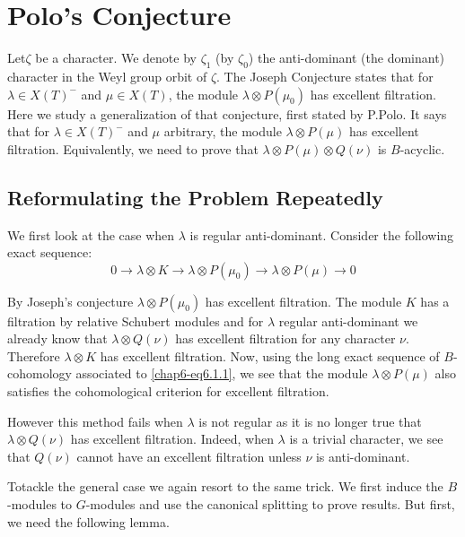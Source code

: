 \chapter{Polo's Conjecture}\label{chap6}

Let\pageoriginale $\zeta$\label{page56} be a character. We denote by $\zeta_{1}$ (by
$\zeta_{0}$) the anti-dominant (the dominant) character in the Weyl
group orbit of $\zeta$. The Joseph Conjecture states that for
$\lambda\in X(T)^{-}$ and $\mu\in X(T)$, the module $\lambda\otimes
P(\mu_{0})$ has excellent filtration. Here we study a generalization
of that conjecture, first stated by P.\@ Polo. It says that for
$\lambda\in X(T)^{-}$ and $\mu$ arbitrary, the module $\lambda\otimes
P(\mu)$ has excellent filtration. Equivalently, we need to prove that
$\lambda\otimes P(\mu)\otimes Q(\nu)$ is $B$-acyclic.

\section{Reformulating the Problem Repeatedly}\label{chap6-sec6.1}

We first look at the case when $\lambda$ is regular
anti-dominant. Consider the following exact sequence:
\begin{equation*}
0\to \lambda\otimes K\to \lambda\otimes P(\mu_{0})\to \lambda\otimes
P(\mu)\to 0\tag{6.1.1}\label{chap6-eq6.1.1}
\end{equation*}

By Joseph's conjecture $\lambda\otimes P(\mu_{0})$ has excellent
filtration. The module $K$ has a filtration by relative Schubert
modules and for $\lambda$ regular anti-dominant we already know that
$\lambda\otimes Q(\nu)$ has excellent filtration for any character
$\nu$. Therefore $\lambda\otimes K$ has excellent filtration. Now,
using the long exact sequence of $B$-cohomology associated to
\eqref{chap6-eq6.1.1}, we see that the module $\lambda\otimes P(\mu)$
also satisfies the cohomological criterion for excellent filtration.

However this method fails when $\lambda$ is not regular as it is no
longer true that $\lambda\otimes Q(\nu)$ has excellent
filtration. Indeed, when $\lambda$ is a trivial character, we see that
$Q(\nu)$ cannot have an excellent filtration unless $\nu$ is
anti-dominant. 

To\pageoriginale tackle\label{page57} the general case we again resort to the same
trick. We first induce the $B$-modules to $G$-modules and use the
canonical splitting to prove results. But first, we need the following
lemma.

